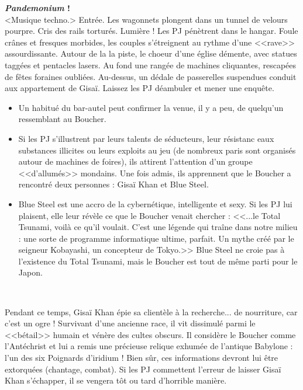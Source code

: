 \documentclass[11pt,twoside,a4paper]{book}
\begin{document}
\textbf{\large \textit{Pandemonium} !}~\\

<Musique techno.> Entr{\'e}e. Les wagonnets plongent dans un tunnel de velours pourpre. Cris des rails tortur{\'e}s. Lumi{\`e}re ! Les PJ p{\'e}n{\`e}trent dans le hangar. Foule cr{\^a}nes et fresques morbides, les couples s'{\'e}treignent au rythme d'une <<rave>> assourdissante. Autour de la la piste, le choeur d'une {\'e}glise d{\'e}mente, avec statues tagg{\'e}es et pentacles lasers. Au fond une rang{\'e}e de machines cliquantes, rescap{\'e}es de f{\^e}tes foraines oubli{\'e}es. Au-dessus, un d{\'e}dale de passerelles suspendues conduit aux appartement de Gisa{\"i}. Laissez les PJ d{\'e}ambuler et mener une enqu{\^e}te.~\\

\setlength\parindent{20pt}
\begin{itemize}
	\item Un habitu{\'e} du bar-autel peut confirmer la venue, il y a peu, de quelqu'un ressemblant au Boucher.
	\item Si les PJ s'illustrent par leurs talents de s{\'e}ducteurs, leur r{\'e}sistanc eaux substances illicites ou leurs exploits au jeu (de nombreux paris sont organis{\'e}s autour de machines de foires), ils attirent l'attention d'un groupe <<d'allum{\'e}s>> mondains. Une fois admis, ils apprennent que le Boucher a rencontr{\'e} deux personnes : Gisa{\"i} Khan et Blue Steel.
	\item Blue Steel est une accro de la cybern{\'e}tique, intelligente et sexy. Si les PJ lui plaisent, elle leur r{\'e}v{\`e}le ce que le Boucher venait chercher : <<...le Total Tsunami, voil{\`a} ce qu'il voulait. C'est une l{\'e}gende qui tra{\^i}ne dans notre milieu : une sorte de programme informatique ultime, parfait. Un mythe cr{\'e}{\'e} par le seigneur Kobayashi, un concepteur de Tokyo.>> Blue Steel ne croie pas {\`a} l'existence du Total Tsunami, mais le Boucher est tout de m{\^e}me parti pour le Japon.
\end{itemize}~\\
\setlength\parindent{0pt}

Pendant ce temps, Gisa{\"i} Khan {\'e}pie sa client{\`e}le {\`a} la recherche... de nourriture, car c'est un ogre ! Survivant d'une ancienne race, il vit dissimul{\'e} parmi le <<b{\'e}tail>> humain et v{\'e}n{\`e}re des cultes obscurs. Il consid{\`e}re le Boucher comme l'Ant{\'e}christ et lui a remis une pr{\'e}cieuse relique exhum{\'e}e de l'antique Babylone : l'un des six Poignards d'iridium ! Bien s{\^u}r, ces informations devront lui {\^e}tre extorqu{\'e}es (chantage, combat). Si les PJ commettent l'erreur de laisser Gisa{\"i} Khan s'{\'e}chapper, il se vengera t{\^o}t ou tard d'horrible mani{\`e}re.~\\
\end{document}
